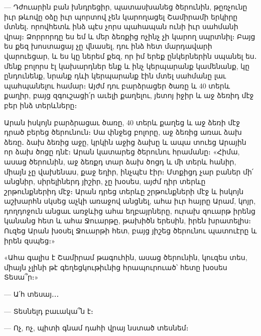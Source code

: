 \documentclass{article}
\begin{document}
{— Դժուարին բան խնդրեցիր, պատասխանեց ծերունին, թըռչունը իւր թևովը օձը իւր պորտով չեն կարողացել Շամիրամի երկիրը մտնել․ որովհետև ինձ պէս չորս պահապան ունի իւր սահմանի վրայ։ Ձորրորդը ես եմ և մեր ձեռքից ոչինչ չի կարող սպրտնիլ։ Բայց ես քեզ խոստացայ չը վնասել, դու ինձ հետ մարդավարի վարուեցար, և ես կը ներեմ քեզ, որ իմ երեք ընկերներին սպանել ես․ մենք բոլորս էլ կախարդներ ենք և ինչ կերպարանք կամենանք, կը ընդունենք, նրանք դևի կերպարանք էին մտել սահմանը լաւ պահպանելու համար։ Այժմ դու բարձրացեր ծառը և 40 տերև քաղիր, բայց զգուշացի՛ր աւելի քաղելու, յետոյ իջիր և աջ ձեռիդ մէջ բեր ինձ տերևները։

Արան իսկոյն բարձրացաւ ծառը, 40 տերև քաղեց և աջ ձեռի մէջ դրած բերեց ծերունուն։ Սա փնջեց բոլորը, աջ ձեռից առաւ ձախ ձեռը․ ձախ ձեռից աջը, կրկին աջից ձախը և ապա տուեց Արային որ ձախ ծոցը դնէ։ Արան կատարեց ծերունու հրամանը։ «Հիմա, ասաց ծերունին, աջ ձեռքդ տար ձախ ծոցդ և մի տերև հանիր, միայն չը վախենաս, քաջ եղիր, ինչպէս էիր։ Մտքիցդ չար բաներ մի՛ անցնիր, սիրելիներդ յիշիր, չը խօսես, այժմ դիր տերևը շրթունքներիդ մէջ։ Արան դրեց տերևը շրթունքների մէջ և իսկոյն աշխարհն սկսեց աչկի առաջով անցնել, ահա իւր հայրը Արամ, կոյր, դողդոջուն անցաւ առջևից ահա եղբայրները, ուրախ զուարթ իրենց կանանց հետ և ահա Ջուարթը, թախիծն երեսին, իրեն խրատելիս։ Ուզեց Արան խօսել Ջուարթի հետ, բայց յիշեց ծերունու պատուէրը և իրեն զսպեց։»

«Ահա գալիս է Շամիրամ թագուհին, ասաց ծերունին, կուզես տես, միայն չլինի թէ գեղեցկութիւնից հրապուրուած՝ հետը խօսես Տեսա՞ր։»

— Ա՛հ տեսայ․․․

— Տեսնելդ բաւակա՞ն է։

— Ոչ, ոչ, պիտի գնամ դահի վրայ նստած տեսնեմ։

}
\end{document}
